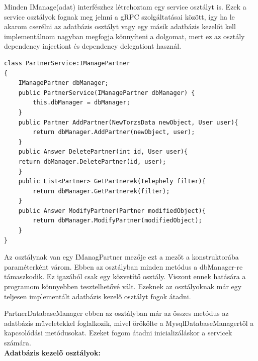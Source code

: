 \documentclass[
]{thesis-ekf}
\theoremstyle{definition}
\theoremstyle{remark}
\begin{document}
Minden IManage(adat) interfészhez létrehoztam egy service osztályt is. Ezek a service osztályok fognak meg jelnni a gRPC szolgáltatásai között, így ha le akarom cserélni az adatbázis osztályt vagy egy másik adatbázis kezelőt kell implementálnom nagyban megfogja könnyíteni a dolgomat, mert ez az osztály dependency injectiont és dependency delegationt használ. 
\begin{lstlisting}[caption={A partnerekkel foglalkozó osztály.},captionpos=b]
class PartnerService:IManagePartner
{
	IManagePartner dbManager;
	public PartnerService(IManagePartner dbManager)	{
		this.dbManager = dbManager;
	}
	public Partner AddPartner(NewTorzsData newObject, User user){
		return dbManager.AddPartner(newObject, user);
	}
	public Answer DeletePartner(int id, User user){
	return dbManager.DeletePartner(id, user);
	}
	public List<Partner> GetPartnerek(Telephely filter){
		return dbManager.GetPartnerek(filter);
	}
	public Answer ModifyPartner(Partner modifiedObject){
		return dbManager.ModifyPartner(modifiedObject);
	}
}

\end{lstlisting}
Az osztálynak van egy IManagPartner mezője ezt a mezőt a konstruktorába paraméterként várom. Ebben az osztályban minden metódus a dbManager-re támaszkodik. Ez igazából csak egy közvetítő osztály. Viszont ennek hatására a programom könnyebben tesztelhetővé vált. Ezeknek az osztályoknak már egy teljesen implementált adatbázis kezelő osztályt fogok átadni.

PartnerDatabaseManager ebben az osztályban már az összes metódus az adatbázis műveletekkel foglalkozik, mivel örökölte a MysqlDatabaseManagertől a kapcsolódási metódusokat. Ezeket fogom átadni inicializáláskor a servicek számára.\\
\textbf{Adatbázis kezelő osztályok:}
\end{document}
